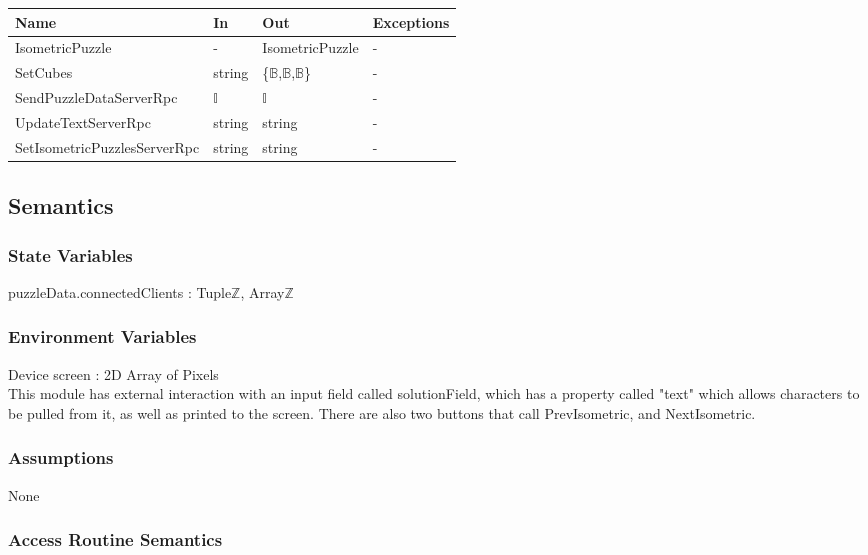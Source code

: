 \documentclass[12pt, titlepage]{article}
\begin{document}
\begin{center}
\begin{tabular}{p{5cm} p{4cm} p{4cm} p{2cm}}
\hline
\textbf{Name} & \textbf{In} & \textbf{Out} & \textbf{Exceptions} \\
\hline
IsometricPuzzle & - & IsometricPuzzle & - \\
SetCubes & string & \{$\mathds{B}$,$\mathds{B}$,$\mathds{B}$\} & - \\
SendPuzzleDataServerRpc & $\mathds{I}$ & $\mathds{I}$ & - \\
UpdateTextServerRpc & string & string & - \\
SetIsometricPuzzlesServerRpc & string & string & - \\
\hline
\end{tabular}
\end{center}

\subsection{Semantics}

\subsubsection{State Variables}

puzzleData.connectedClients : Tuple\textlangle$\mathds{Z}$, Array\textlangle$\mathds{Z}$\textrangle\textrangle

\subsubsection{Environment Variables}

Device screen : 2D Array of Pixels\\
This module has external interaction with an input field called solutionField, which has a property called "text" which allows characters to be pulled from it, as well as printed to the screen. There are also two buttons that call PrevIsometric, and NextIsometric.

\subsubsection{Assumptions}

None

\subsubsection{Access Routine Semantics}
\end{document}
